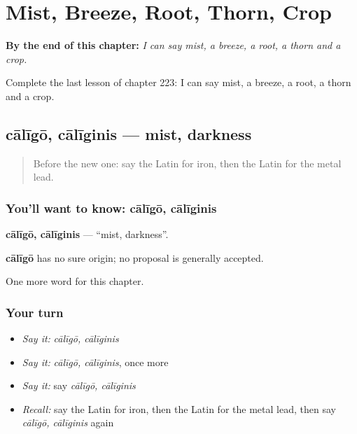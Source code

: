 
\chapter{Mist, Breeze, Root, Thorn, Crop}
\label{ch:la-mist-breeze-root-thorn-crop}

\begin{chapteropening}
\textbf{By the end of this chapter:} \emph{I can say mist, a breeze, a root, a thorn and a crop.}

Complete the last lesson of chapter 223: I can say mist, a breeze, a root, a thorn and a crop.
\end{chapteropening}

\section[cālīgō, cālīginis]{cālīgō, cālīginis — mist, darkness}

\label{lesson:LA-C223-caligo}



\begin{quote}
Before the new one: say the Latin for iron, then the Latin for the metal lead.
\end{quote}

\subsection*{You'll want to know: cālīgō, cālīginis}
\textbf{cālīgō, cālīginis} — \textquotedblleft{}mist, darkness\textquotedblright{}.

\begin{cousinweb}
\textbf{cālīgō} has no sure origin; no proposal is generally accepted.
\end{cousinweb}

\begin{grammarlens}[title={What you've built}]
One more word for this chapter.
\end{grammarlens}

\subsection*{Your turn}
\begin{itemize}
\raggedright
  \item \emph{Say it:} \emph{cālīgō, cālīginis}
  \item \emph{Say it:} \emph{cālīgō, cālīginis}, once more
  \item \emph{Say it:} say \emph{cālīgō, cālīginis}
  \item \emph{Recall:} say the Latin for iron, then the Latin for the metal lead, then say \emph{cālīgō, cālīginis} again
\end{itemize}

